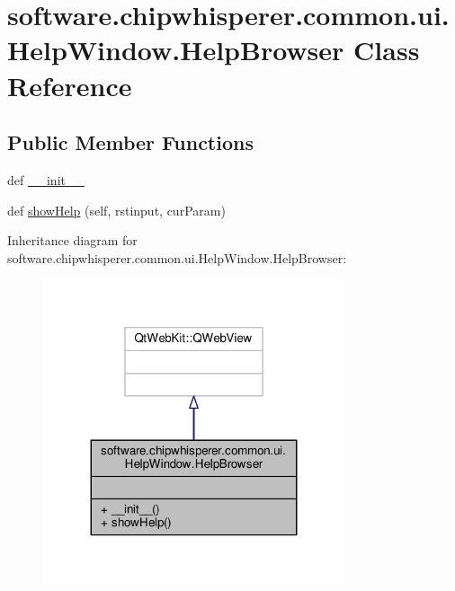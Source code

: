 \hypertarget{classsoftware_1_1chipwhisperer_1_1common_1_1ui_1_1HelpWindow_1_1HelpBrowser}{}\section{software.\+chipwhisperer.\+common.\+ui.\+Help\+Window.\+Help\+Browser Class Reference}
\label{classsoftware_1_1chipwhisperer_1_1common_1_1ui_1_1HelpWindow_1_1HelpBrowser}
\subsection*{Public Member Functions}
\begin{DoxyCompactItemize}
\item 
def \hyperlink{classsoftware_1_1chipwhisperer_1_1common_1_1ui_1_1HelpWindow_1_1HelpBrowser_a7fd5fa7757481a20b2891ab7ed745f41}{\+\_\+\+\_\+init\+\_\+\+\_\+}
\item 
def \hyperlink{classsoftware_1_1chipwhisperer_1_1common_1_1ui_1_1HelpWindow_1_1HelpBrowser_aa2c553aac3a40d61d61d07543dd58c5d}{show\+Help} (self, rstinput, cur\+Param)
\end{DoxyCompactItemize}


Inheritance diagram for software.\+chipwhisperer.\+common.\+ui.\+Help\+Window.\+Help\+Browser\+:\nopagebreak
\begin{figure}[H]
\begin{center}
\leavevmode
\includegraphics[width=251pt]{dc/d8c/classsoftware_1_1chipwhisperer_1_1common_1_1ui_1_1HelpWindow_1_1HelpBrowser__inherit__graph}
\end{center}
\end{figure}


